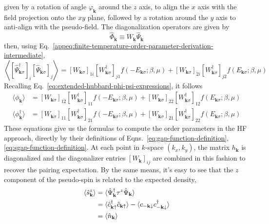 given by a rotation of angle $\varphi_\mathbf{k}$ around the $z$ axis, to align the $x$ axis with the field projection onto the $xy$ plane, followed by a rotation around the $y$ axis to anti-align with the pseudo-field. The diagonalization operators are given by
\[
	\hat\Phi_\mathbf{k} \equiv W_\mathbf{k} \hat\Psi_\mathbf{k}
\]
then, using Eq.~\eqref{appeq:finite-temperature-order-parameter-derivation-intermediate}, 
\[
	\left\langle [\hat \Psi_{\mathbf{k}\sigma}^\dagger]_i [\hat \Psi_{\mathbf{k}\sigma}]_j \right\rangle = [W_{\mathbf{k}\sigma}]_{1 i} [W_{\mathbf{k}\sigma}^\dagger]_{j 1} f\left( -E_{\mathbf{k}\sigma}; \beta,\mu \right) + [W_{\mathbf{k}\sigma}]_{2 i} [W_{\mathbf{k}\sigma}^\dagger]_{j 2} f\left( E_{\mathbf{k}\sigma}; \beta,\mu \right)
\]
Recalling Eq.~\eqref{eq:extended-hubbard-phi-psi-expressions}, it follows
\begin{align}
	\langle \phi_\mathbf{k} \rangle &= [W_{\mathbf{k}\sigma}]_{12} [W_{\mathbf{k}\sigma}^\dagger]_{11} f\left( -E_{\mathbf{k}\sigma}; \beta,\mu \right) + [W_{\mathbf{k}\sigma}]_{22} [W_{\mathbf{k}\sigma}^\dagger]_{12} f\left( E_{\mathbf{k}\sigma}; \beta,\mu \right) \label{eq:pairing-expectation} \\
	\langle \phi_\mathbf{k}^\dagger \rangle &= [W_{\mathbf{k}\sigma}]_{11} [W_{\mathbf{k}\sigma}^\dagger]_{21} f\left( -E_{\mathbf{k}\sigma}; \beta,\mu \right) + [W_{\mathbf{k}\sigma}]_{21} [W_{\mathbf{k}\sigma}^\dagger]_{22} f\left( E_{\mathbf{k}\sigma}; \beta,\mu \right) \label{eq:pairing-dagger-expectation}
\end{align}
These equations give us the formulas to compute the order parameters in the HF approach, directly by their definitions of Eqns.~\eqref{eq:gap-function-definition}, \eqref{eq:sgap-function-definition}. At each point in $k$-space $(k_x,k_y)$, the matrix $h_\mathbf{k}$ is diagonalized and the diagonalizer entries $[W_\mathbf{k}]_{ij}$ are combined in this fashion to recover the pairing expectation. By the same means, it's easy to see that the $z$ component of the pseudo-spin is related to the expected density,
\[
\begin{aligned}
	\ev{\hat s_\mathbf{k}^z} &= \langle \hat\Psi_\mathbf{k}^\dagger \tau^z \hat\Psi_\mathbf{k} \rangle \\
	&= \langle
		\hat c_{\mathbf{k}\uparrow}^\dagger \hat c_{\mathbf{k}\uparrow}
	\rangle - \langle
		c_{-\mathbf{k}\downarrow} c_{-\mathbf{k}\downarrow}^\dagger
	\rangle \\
	&= \langle \hat n_\mathbf{k} \rangle
\end{aligned}
\]
